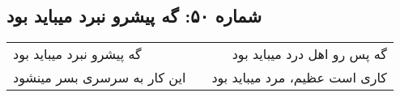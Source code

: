 \begin{center}
\section*{شماره ۵۰: گه پیشرو نبرد میباید بود}
\label{sec:050}
\begin{longtable}{l p{0.5cm} r}
گه پیشرو نبرد میباید بود
&&
گه پس رو اهل درد میباید بود
\\
این کار به سرسری بسر مینشود
&&
کاری است عظیم، مرد میباید بود
\\
\end{longtable}
\end{center}
